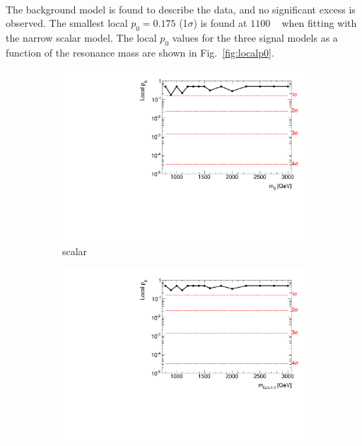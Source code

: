 \paragraph{}
The background model is found to describe the data, and no significant excess is observed. 
The smallest local $p_0=0.175$ (1$\sigma$) is found at $1100$ \GeV~ when fitting with the narrow scalar model. 
The local $p_0$ values for the three signal models as a function of the resonance mass are shown in Fig.~\ref{fig:localp0}.

\begin{figure}[htb!]
\centering
\captionsetup{justification=centering}
    \hspace{-2.5cm}
    \begin{subfigure}[b]{0.35\textwidth}
        \includegraphics[width=\textwidth,angle=-90]{figures/boosted/results/p0_s_allmasses_boosted.pdf}
        \caption{scalar}
        \label{fig:localp0-s}
    \end{subfigure}
    \quad \quad \quad \quad \quad
    \begin{subfigure}[b]{0.35\textwidth}
        \includegraphics[width=\textwidth,angle=-90]{figures/boosted/results/p0_g10_allmasses_boosted.pdf}

\end{subfigure}
\end{figure}

